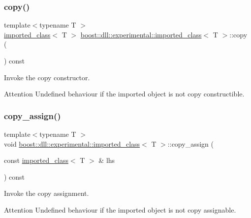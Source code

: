 \subsubsection{\texorpdfstring{copy()}{copy()}}
{\footnotesize\ttfamily template$<$typename T $>$ \\
\hyperlink{a01664}{imported\+\_\+class}$<$ T $>$ \hyperlink{a01664}{boost\+::dll\+::experimental\+::imported\+\_\+class}$<$ T $>$\+::copy (\begin{DoxyParamCaption}{ }\end{DoxyParamCaption}) const\hspace{0.3cm}{\ttfamily [inline]}}



Invoke the copy constructor. 

\begin{DoxyAttention}{Attention}
Undefined behaviour if the imported object is not copy constructible. 
\end{DoxyAttention}
\mbox{\label{a01664_aabf3d4c96c020a756b73db59dfbf46ba}} 
\subsubsection{\texorpdfstring{copy\+\_\+assign()}{copy\_assign()}}
{\footnotesize\ttfamily template$<$typename T $>$ \\
void \hyperlink{a01664}{boost\+::dll\+::experimental\+::imported\+\_\+class}$<$ T $>$\+::copy\+\_\+assign (\begin{DoxyParamCaption}\item[{const \hyperlink{a01664}{imported\+\_\+class}$<$ T $>$ \&}]{lhs }\end{DoxyParamCaption}) const\hspace{0.3cm}{\ttfamily [inline]}}



Invoke the copy assignment. 

\begin{DoxyAttention}{Attention}
Undefined behaviour if the imported object is not copy assignable. 
\end{DoxyAttention}
\mbox{\label{a01664_a081d37ced4c6ac2b130d353dac432854}} 
